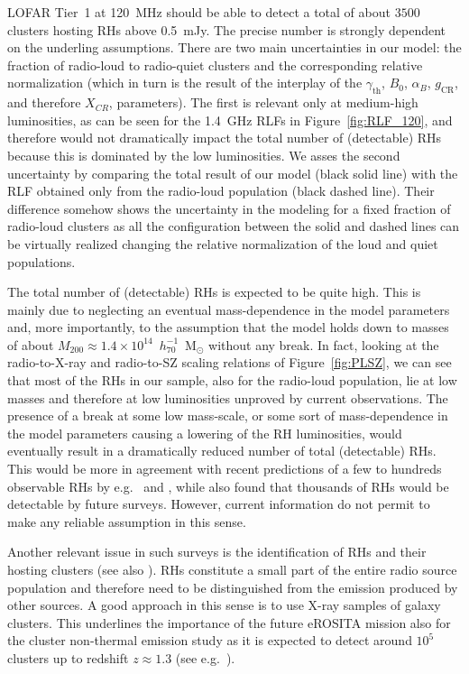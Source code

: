\documentclass[traditabstract]{aa}
\newcommand{\rmn}{\mathrm}
\begin{document}
LOFAR Tier~1 at 120~MHz should be able to detect a total of about $3500$ clusters hosting RHs above 0.5~mJy. The precise number is strongly dependent on the underling assumptions. There are two main uncertainties in our model: the fraction of radio-loud to radio-quiet clusters and the corresponding relative normalization (which in turn is the result of the interplay of the $\gamma_{\rmn{th}}$, $B_{0}$, $\alpha_{B}$, $g_{\rmn{CR}}$, and therefore $X_{CR}$, parameters). The first is relevant only at medium-high luminosities, as can be seen for the 1.4~GHz RLFs in Figure~\ref{fig:RLF_120}, and therefore would not dramatically impact the total number of (detectable) RHs because this is dominated by the low luminosities. We asses the second uncertainty by comparing the total result of our model (black solid line) with the RLF obtained only from the radio-loud population (black dashed line). Their difference somehow shows the uncertainty in the modeling for a fixed fraction of radio-loud clusters as all the configuration between the solid and dashed lines can be virtually realized changing the relative normalization of the loud and quiet populations. 

The total number of (detectable) RHs is expected to be quite high. This is mainly due to neglecting an eventual mass-dependence in the model parameters and, more importantly, to the assumption that the model holds down to masses of about $M_{200}\approx1.4\times10^{14}$~$h_{70}^{-1}$~M$_{\odot}$ without any break. In fact, looking at the radio-to-X-ray and radio-to-SZ scaling relations of Figure~\ref{fig:PLSZ}, we can see that most of the RHs in our sample, also for the radio-loud population, lie at low masses and therefore at low luminosities unproved by current observations. The presence of a break at some low mass-scale, or some sort of mass-dependence in the model parameters causing a lowering of the RH luminosities, would eventually result in a dramatically reduced number of total (detectable) RHs. This would be more in agreement with recent predictions of a few to hundreds observable RHs by e.g.~\cite{2010A&A...509A..68C} and \cite{2011arXiv1110.2786S}, while \cite{2002A&A...396...83E} also found that thousands of RHs would be detectable by future surveys. However, current information do not permit to make any reliable assumption in this sense. 

Another relevant issue in such surveys is the identification of RHs and their hosting clusters (see also \citealp{2010A&A...509A..68C}). RHs constitute a small part of the entire radio source population and therefore need to be distinguished from the emission produced by other sources. A good approach in this sense is to use X-ray samples of galaxy clusters. This underlines the importance of the future eROSITA mission also for the cluster non-thermal emission study as it is expected to detect around $10^{5}$ clusters up to redshift $z \approx 1.3$ (see e.g.~\citealp{2011MSAIS..17..159C}).
\end{document}
